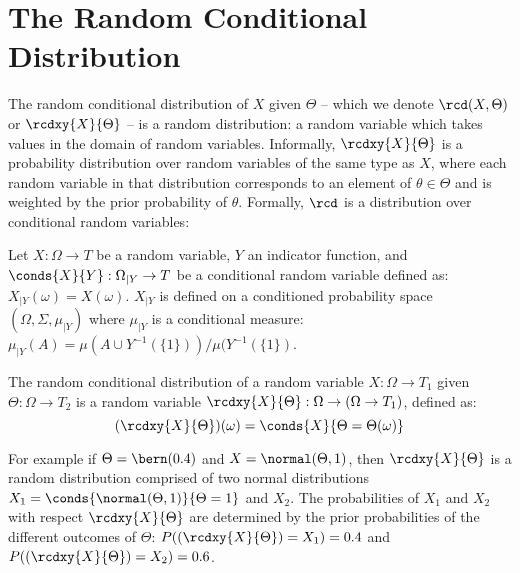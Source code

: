 

\section{The Random Conditional Distribution}
The random conditional distribution of $X$ given $\Theta$ -- which we denote $\rcd(X, \Theta)$ or $\rcdxy{X}{\Theta}$ -- is a random distribution: a random variable which takes values in the domain of random variables.
Informally, $\rcdxy{X}{\Theta}$ is a probability distribution over random variables of the same type as $X$, where each random variable in that distribution corresponds to an element of $\theta \in \Theta$ and is weighted by the prior probability of $\theta$.
Formally, $\rcd$ is a distribution over conditional random variables:

\begin{definition}
Let $X:\Omega \to T$ be a random variable, $Y$ an indicator function, and $\conds{X}{Y}: \Omega_{|Y} \to T$ be a conditional random variable defined as: $X_{|Y}(\omega) = X(\omega)$.
$X_{|Y}$ is defined on a conditioned probability space $(\Omega, \Sigma, \mu_{|Y})$ where $\mu_{|Y}$ is a conditional measure: $
\mu_{|Y}(A) = \mu(A \cup Y^{-1}(\{1\})) / \mu(Y^{-1}(\{1\})$.
\end{definition}


\begin{definition}The random conditional distribution of a random variable $X: \Omega \to T_1$ given $\Theta: \Omega \to T_2$ is a random variable $\rcdxy{X}{\Theta}: \Omega \to (\Omega \to T_1)$, defined as:
\begin{equation}\label{eq:rcd}
(\rcdxy{X}{\Theta})(\omega) = \conds{X}{\Theta = \Theta(\omega)}
\end{equation}
\end{definition}
For example if $\Theta = \bern(0.4)$ and $X = \normal(\Theta, 1)$, then $\rcdxy{X}{\Theta}$ is a random distribution comprised of two normal distributions $X_1 = \conds{\normal(\Theta, 1)}{\Theta = 1}$ and $X_2$.
The probabilities of $X_1$ and $X_2$ with respect $\rcdxy{X}{\Theta}$ are determined by the prior probabilities of the different outcomes of $\Theta$: $P((\rcdxy{X}{\Theta}) = X_1) = 0.4$ and $P((\rcdxy{X}{\Theta}) = X_2) = 0.6$.

